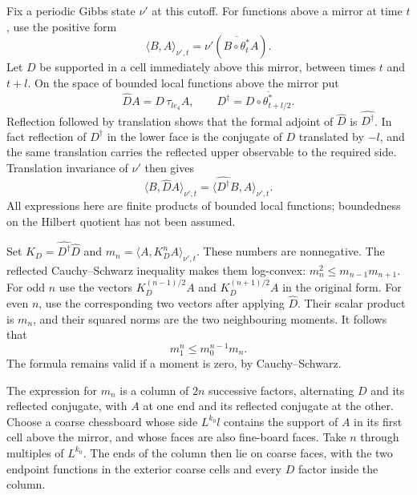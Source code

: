 \documentclass[11pt,letterpaper,reqno]{amsart}
\theoremstyle{definition}
\theoremstyle{remark}
\begin{document}
Fix a periodic Gibbs state $\nu'$ at this cutoff. For functions above
a mirror at time $t$, use the positive form
\[
 \langle B,A\rangle_{\nu',t}
                =\nu'(\overline{B\circ\theta_t^*}A).
\]
Let $D$ be supported in a cell immediately above this mirror, between
times $t$ and $t+l$. On the space of bounded local functions above
the mirror put
\[
 \widehat D A=D\,\tau_{le_4}A,
 \qquad D^\dagger=\overline{D\circ\theta_{t+l/2}^*}.
\]
Reflection followed by translation shows that the formal adjoint of
$\widehat D$ is $\widehat{D^\dagger}$. In fact reflection of
$D^\dagger$ in the lower face is the conjugate of $D$ translated
by $-l$, and the same translation carries the reflected upper
observable to the required side. Translation invariance of $\nu'$
then gives
\[
 \langle B,\widehat DA\rangle_{\nu',t}
              =\langle\widehat{D^\dagger}B,A\rangle_{\nu',t}.
\]
All expressions here are finite products of bounded local functions;
boundedness on the Hilbert quotient has not been assumed.

Set $K_D=\widehat{D^\dagger}\widehat D$ and
$m_n=\langle A,K_D^nA\rangle_{\nu',t}$. These numbers are
nonnegative. The reflected Cauchy--Schwarz inequality makes them
log-convex:
$m_n^2\le m_{n-1}m_{n+1}$. For odd $n$ use the vectors
$K_D^{(n-1)/2}A$ and $K_D^{(n+1)/2}A$ in the original form. For
even $n$, use the corresponding two vectors after applying
$\widehat D$. Their scalar product is $m_n$, and their squared
norms are the two neighbouring moments. It follows that
\[
 m_1^n\le m_0^{n-1}m_n.
\]
The formula remains valid if a moment is zero, by Cauchy--Schwarz.

The expression for $m_n$ is a column of $2n$ successive factors,
alternating $D$ and its reflected conjugate, with $A$ at one end
and its reflected conjugate at the other. Choose a coarse chessboard
whose side $L^{k_0}l$ contains the support of $A$ in its first cell
above the mirror, and whose faces are also fine-board faces. Take $n$
through multiples of $L^{k_0}$. The ends of the column then lie on
coarse faces, with the two endpoint functions in the exterior coarse
cells and every $D$ factor inside the column.
\end{document}
